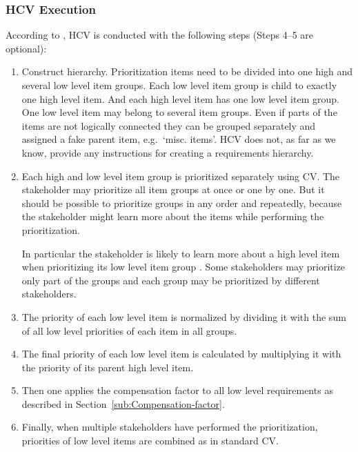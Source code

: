\subsubsection{HCV Execution}
According to \cite{Berander2006a}, HCV is conducted with the following
steps (Steps 4--5 are optional):

\begin{enumerate}
\item Construct hierarchy. Prioritization items need to be divided into
one high and several low level item groups. Each low level item group
is child to exactly one high level item. And each high level item
has one low level item group. One low level item may belong to several
item groups. Even if parts of the items are not logically connected they
can be grouped separately and assigned a fake parent item, e.g.\ `misc.
items'. HCV does not, as far as we know, provide any instructions for 
creating a requirements hierarchy.

\item Each high and low level item group is prioritized separately using
CV. The stakeholder may prioritize all item groups at once or one by one.
But it should be possible to prioritize groups in any order and repeatedly,
because the stakeholder might learn more about the items while performing the prioritization.

In particular the stakeholder is likely to learn more about a high level item when
prioritizing its low level item group \cite{Berander2009a}. Some stakeholders
may prioritize only part of the groups and each group may be prioritized
by different stakeholders.

\item The priority of each low level item is normalized by dividing it with
the sum of all low level priorities of each item in all groups.


\item The final priority of each low level item is calculated by multiplying
it with the priority of its parent high level item.

\item Then one applies the compensation factor to all low level requirements as described
in Section~\ref{sub:Compensation-factor}.

\item Finally, when multiple stakeholders have performed the prioritization, priorities
of low level items are combined as in standard CV.
\end{enumerate}

